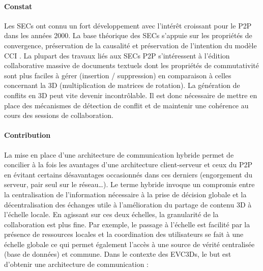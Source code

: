 \paragraph{Constat} Les \glspl{SEC} ont connu un fort développement avec 
l'intérêt 
croissant 
pour le \gls{P2P} dans les années 2000. 
La base théorique des \glspl{SEC} s'appuie sur les propriétés de 
convergence, préservation de la causalité et préservation de l'intention du modèle 
\acrshort{CCI} \cite{Sun1998}. 
La plupart des travaux liés aux \glspl{SEC} \gls{P2P} s'intéressent à 
l'édition collaborative massive de documents textuels dont les propriétés 
de commutativité sont plus faciles à gérer (insertion / suppression) en 
comparaison à celles concernant la 3D (multiplication de matrices de 
rotation). La génération de conflits en 3D peut vite devenir incontrôlable. Il est 
donc nécessaire de mettre en place des mécanismes de détection de 
conflit et de maintenir une cohérence au cours des sessions de 
collaboration. 








\paragraph{Contribution}
La mise en place d'une architecture de communication 
hybride permet de concilier à la 
fois les avantages d'une architecture client-serveur et ceux du \gls{P2P} en évitant 
certains désavantages occasionnés dans ces derniers (engorgement du serveur, 
pair seul sur le réseau\dots). 
Le terme \og hybride\fg{} invoque un compromis entre la 
centralisation de l'information nécessaire à la prise de décision globale et 
la décentralisation des échanges utile à l'amélioration du partage de 
contenu 3D à l'échelle locale. 
En agissant sur ces deux échelles, la granularité de la collaboration est plus fine. 
Par exemple, le passage à l'échelle est facilité par la présence de 
ressources locales et la coordination des utilisateurs se fait à une échelle 
globale ce qui permet également l'accès à une source de vérité 
centralisée (base de données) et commune.
Dans le contexte des \glspl{EVC3D}, le but 
est d'obtenir une architecture de communication : 

